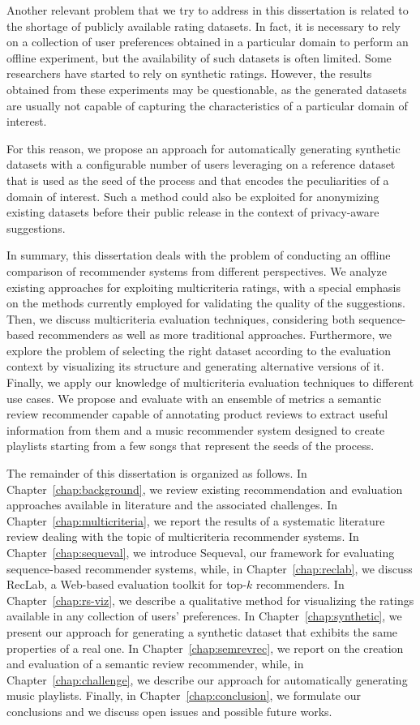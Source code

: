 Another relevant problem that we try to address in this dissertation is related to the shortage of publicly available rating datasets. In fact, it is necessary to rely on a collection of user preferences obtained in a particular domain to perform an offline experiment, but the availability of such datasets is often limited. Some researchers have started to rely on synthetic ratings. However, the results obtained from these experiments may be questionable, as the generated datasets are usually not capable of capturing the characteristics of a particular domain of interest.

For this reason, we propose an approach for automatically generating synthetic datasets with a configurable number of users leveraging on a reference dataset that is used as the seed of the process and that encodes the peculiarities of a domain of interest. Such a method could also be exploited for anonymizing existing datasets before their public release in the context of privacy-aware suggestions.

In summary, this dissertation deals with the problem of conducting an offline comparison of recommender systems from different perspectives. We analyze existing approaches for exploiting multicriteria ratings, with a special emphasis on the methods currently employed for validating the quality of the suggestions. Then, we discuss multicriteria evaluation techniques, considering both sequence-based recommenders as well as more traditional approaches. Furthermore, we explore the problem of selecting the right dataset according to the evaluation context by visualizing its structure and generating alternative versions of it. Finally, we apply our knowledge of multicriteria evaluation techniques to different use cases. We propose and evaluate with an ensemble of metrics a semantic review recommender capable of annotating product reviews to extract useful information from them and a music recommender system designed to create playlists starting from a few songs that represent the seeds of the process.

The remainder of this dissertation is organized as follows. In Chapter~\ref{chap:background}, we review existing recommendation and evaluation approaches available in literature and the associated challenges. In Chapter~\ref{chap:multicriteria}, we report the results of a systematic literature review dealing with the topic of multicriteria recommender systems. In Chapter~\ref{chap:sequeval}, we introduce Sequeval, our framework for evaluating sequence-based recommender systems, while, in Chapter~\ref{chap:reclab}, we discuss RecLab, a Web-based evaluation toolkit for top-$k$ recommenders. In Chapter~\ref{chap:rs-viz}, we describe a qualitative method for visualizing the ratings available in any collection of users' preferences. In Chapter~\ref{chap:synthetic}, we present our approach for generating a synthetic dataset that exhibits the same properties of a real one. In Chapter~\ref{chap:semrevrec}, we report on the creation and evaluation of a semantic review recommender, while, in Chapter~\ref{chap:challenge}, we describe our approach for automatically generating music playlists. Finally, in Chapter~\ref{chap:conclusion}, we formulate our conclusions and we discuss open issues and possible future works.
